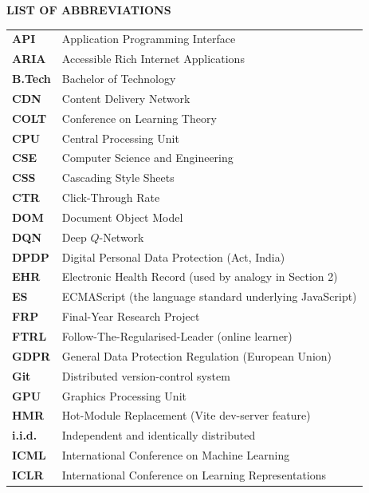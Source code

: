 \begin{center}{\Large\bfseries LIST OF ABBREVIATIONS}\end{center}
\vspace{0.5em}

\renewcommand{\arraystretch}{1.35}
\begin{xltabular}{\linewidth}{@{}p{3.5cm} X@{}}
\textbf{API}        & Application Programming Interface\\
\textbf{ARIA}       & Accessible Rich Internet Applications\\
\textbf{B.Tech}     & Bachelor of Technology\\
\textbf{CDN}        & Content Delivery Network\\
\textbf{COLT}       & Conference on Learning Theory\\
\textbf{CPU}        & Central Processing Unit\\
\textbf{CSE}        & Computer Science and Engineering\\
\textbf{CSS}        & Cascading Style Sheets\\
\textbf{CTR}        & Click-Through Rate\\
\textbf{DOM}        & Document Object Model\\
\textbf{DQN}        & Deep $Q$-Network\\
\textbf{DPDP}       & Digital Personal Data Protection (Act, India)\\
\textbf{EHR}        & Electronic Health Record (used by analogy in Section 2)\\
\textbf{ES}         & ECMAScript (the language standard underlying JavaScript)\\
\textbf{FRP}        & Final-Year Research Project\\
\textbf{FTRL}       & Follow-The-Regularised-Leader (online learner)\\
\textbf{GDPR}       & General Data Protection Regulation (European Union)\\
\textbf{Git}        & Distributed version-control system\\
\textbf{GPU}        & Graphics Processing Unit\\
\textbf{HMR}        & Hot-Module Replacement (Vite dev-server feature)\\
\textbf{i.i.d.}     & Independent and identically distributed\\
\textbf{ICML}       & International Conference on Machine Learning\\
\textbf{ICLR}       & International Conference on Learning Representations\\

\end{xltabular}
